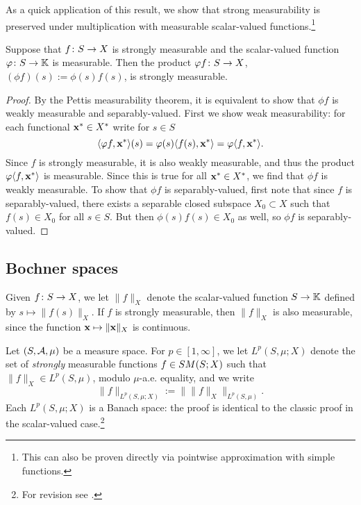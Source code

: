 As a quick application of this result, we show that strong measurability is preserved under multiplication with measurable scalar-valued functions.\footnote{This can also be proven directly via pointwise approximation with simple functions.}

\begin{cor}\label{cor:strong-meas-meas-mult}
  Suppose that $f \colon S \rightarrow X$ is strongly measurable and the scalar-valued function $\varphi \colon S \rightarrow \mathbb{K}$ is measurable.
  Then the product $\varphi f \colon S \rightarrow X$, $(\phi f)(s) := \phi(s)f(s)$, is strongly measurable.
\end{cor}

\begin{proof}
  By the Pettis measurability theorem, it is equivalent to show that $\phi f$ is weakly measurable and separably-valued. 
  First we show weak measurability: for each functional $\mathbf{x}^* \in X^*$ write for $s \in S$
  \begin{equation*}
    \langle \varphi f, \mathbf{x}^* \rangle(s) = \varphi(s) \langle f(s) , \mathbf{x}^* \rangle = \varphi \langle f, \mathbf{x}^* \rangle.
  \end{equation*}
  Since $f$ is strongly measurable, it is also weakly measurable, and thus the product $\varphi \langle f, \mathbf{x}^* \rangle$ is measurable.
  Since this is true for all $\mathbf{x}^* \in X^*$, we find that $\phi f$ is weakly measurable.
  To show that $\phi f$ is separably-valued, first note that since $f$ is separably-valued, there exists a separable closed subspace $X_0 \subset X$ such that $f(s) \in X_0$ for all $s \in S$.
  But then $\phi(s)f(s) \in X_0$ as well, so $\phi f$ is separably-valued.
\end{proof}

\subsection{Bochner spaces}

Given $f \colon S \rightarrow X$, we let $\|f\|_X$ denote the scalar-valued function $S \to \mathbb{K}$ defined by $s \mapsto \|f(s)\|_X$.
If $f$ is strongly measurable, then $\|f\|_X$ is also measurable, since the function $\mathbf{x} \mapsto \|\mathbf{x}\|_X$ is continuous.

\begin{defn}
  Let $(S,\mathcal{A},\mu)$ be a measure space.
  For $p \in [1,\infty]$, we let $L^p(S,\mu;X)$ denote the set of \emph{strongly} measurable functions $f \in SM(S;X)$ such that $\|f\|_X \in L^p(S,\mu)$, modulo $\mu$-a.e. equality, and we write
  \begin{equation*}
    \|f\|_{L^p(S,\mu;X)} := \| \|f\|_X \|_{L^p(S,\mu)}.
  \end{equation*}
  Each $L^p(S,\mu;X)$ is a Banach space: the proof is identical to the classic proof in the scalar-valued case.\footnote{For revision see \cite[Theorem 5.2.1]{rD04}.}
\end{defn}

